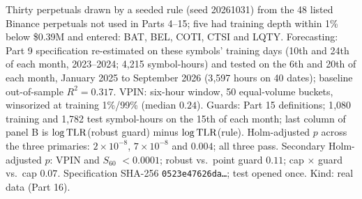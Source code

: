 \documentclass[12pt]{article}
\theoremstyle{definition}
\theoremstyle{remark}
\begin{document}
\begin{table}[!tbp]
\begin{threeparttable}
\begin{tablenotes}\footnotesize\item Thirty perpetuals drawn by a seeded rule (seed 20261031) from the 48 listed Binance perpetuals not used in Parts 4--15; five had training depth within 1\% below \$0.39M and entered: BAT, BEL, COTI, CTSI and LQTY. Forecasting: Part 9 specification re-estimated on these symbols' training days (10th and 24th of each month, 2023--2024; 4{,}215 symbol-hours) and tested on the 6th and 20th of each month, January 2025 to September 2026 (3{,}597 hours on 40 dates); baseline out-of-sample $R^2=0.317$. VPIN: six-hour window, 50 equal-volume buckets, winsorized at training 1\%/99\% (median $0.24$). Guards: Part 15 definitions; 1{,}080 training and 1{,}782 test symbol-hours on the 15th of each month; last column of panel B is $\log{\rm TLR}$(robust guard) minus $\log{\rm TLR}$(rule). Holm-adjusted $p$ across the three primaries: $2\times10^{-8}$, $7\times10^{-8}$ and $0.004$; all three pass. Secondary Holm-adjusted $p$: VPIN and $S_{60}$ $<0.0001$; robust vs.\ point guard $0.11$; cap $\times$ guard vs.\ cap $0.07$. Specification SHA-256 \texttt{0523e47626da\ldots}; test opened once. Kind: real data (Part 16).\end{tablenotes}
\end{threeparttable}
\end{table}
\FloatBarrier
\end{document}
